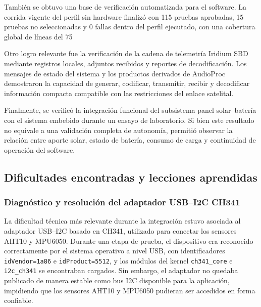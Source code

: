 También se obtuvo una base de verificación automatizada para el software. La corrida vigente del perfil sin hardware finalizó con 115 pruebas aprobadas, 15 pruebas no seleccionadas y 0 fallas dentro del perfil ejecutado, con una cobertura global de líneas del 75~%

Otro logro relevante fue la verificación de la cadena de telemetría Iridium SBD mediante registros locales, adjuntos recibidos y reportes de decodificación. Los mensajes de estado del sistema y los productos derivados de AudioProc demostraron la capacidad de generar, codificar, transmitir, recibir y decodificar información compacta compatible con las restricciones del enlace satelital.

Finalmente, se verificó la integración funcional del subsistema panel solar--batería con el sistema embebido durante un ensayo de laboratorio. Si bien este resultado no equivale a una validación completa de autonomía, permitió observar la relación entre aporte solar, estado de batería, consumo de carga y continuidad de operación del software.

\subsection{Dificultades encontradas y lecciones aprendidas}

\subsubsection*{Diagnóstico y resolución del adaptador USB--I2C CH341}

La dificultad técnica más relevante durante la integración estuvo asociada al adaptador USB--I2C basado en CH341, utilizado para conectar los sensores AHT10 y MPU6050. Durante una etapa de prueba, el dispositivo era reconocido correctamente por el sistema operativo a nivel USB, con identificadores \texttt{idVendor=1a86} e \texttt{idProduct=5512}, y los módulos del kernel \texttt{ch341\_core} e \texttt{i2c\_ch341} se encontraban cargados. Sin embargo, el adaptador no quedaba publicado de manera estable como bus I2C disponible para la aplicación, impidiendo que los sensores AHT10 y MPU6050 pudieran ser accedidos en forma confiable.

